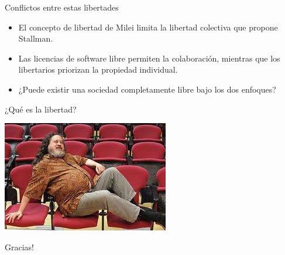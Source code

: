 \documentclass{beamer}
\begin{document}
\begin{frame}{Conflictos entre estas libertades}
    \begin{itemize}
        \item El concepto de libertad  de Milei limita la libertad colectiva que propone Stallman. \pause
        \item Las licencias de software libre permiten la colaboración, mientras que los libertarios priorizan la propiedad individual. \pause
        \item ¿Puede existir una sociedad completamente libre bajo los dos enfoques?
    \end{itemize}
\end{frame}

\begin{frame}
    \centering
    \Huge ¿Qué es la libertad?
\end{frame}

\begin{frame}
  \includegraphics[width=\linewidth]{images/si.jpeg}
\end{frame}

\begin{frame}
    \centering
    \Huge Gracias!
\end{frame}
\end{document}
